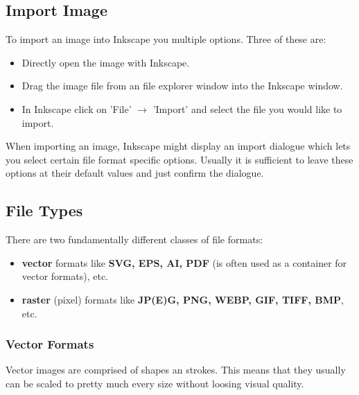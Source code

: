 \documentclass{article}
\begin{document}
        \pagebreak

        \subsection{Import Image}
            
            To import an image into Inkscape you multiple options. Three of these are:

            \begin{itemize}
                \item Directly open the image with Inkscape.
                \item Drag the image file from an file explorer window into the Inkscape window.
                \item In Inkscape click on 'File' $\rightarrow$ 'Import' and select the file you would like to import.
            \end{itemize}

            When importing an image, Inkscape might display an import dialogue which lets you select certain file format specific options.
            Usually it is sufficient to leave these options at their default values and just confirm the dialogue.
        
        \subsection{File Types}

            There are two fundamentally different classes of file formats:
            \begin{itemize}
                \item \textbf{vector} formats like \textbf{SVG, EPS, AI, PDF} (is often used as a container for vector formats), etc. 
                \item \textbf{raster} (pixel) formats like \textbf{JP(E)G, PNG, WEBP, GIF, TIFF, BMP}, etc.
            \end{itemize}     

            \subsubsection{Vector Formats}

                Vector images are comprised of shapes an strokes.
                This means that they usually can be scaled to pretty much every size without loosing visual quality.
                
\end{document}
